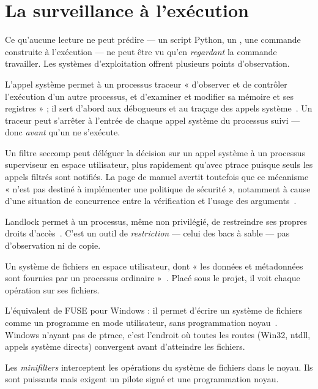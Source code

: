 \section{La surveillance à l'exécution}
\label{sec:execution}

Ce qu'aucune lecture ne peut prédire --- un script Python, un , une commande
construite à l'exécution --- ne peut être vu qu'en \emph{regardant} la commande travailler.
Les systèmes d'exploitation offrent plusieurs points d'observation.

\begin{description}[style=nextline,leftmargin=0.6cm,font=\sffamily\bfseries]
  \item[ptrace (Linux)]
    L'appel système  permet à un processus traceur « d'observer et de
    contrôler l'exécution d'un autre processus, et d'examiner et modifier sa mémoire et ses
    registres » ; il sert d'abord aux débogueurs et au traçage des appels
    système~\cite{man-ptrace}. Un traceur peut s'arrêter à l'entrée de chaque appel système
    du processus suivi --- donc \emph{avant} qu'un  ne s'exécute.
  \item[seccomp avec notification (Linux)]
    Un filtre seccomp peut déléguer la décision sur un appel système à un processus
    superviseur en espace utilisateur, plus rapidement qu'avec ptrace puisque seuls les
    appels filtrés sont notifiés. La page de manuel avertit toutefois que ce mécanisme
    « n'est pas destiné à implémenter une politique de sécurité », notamment à cause d'une
    situation de concurrence entre la vérification et l'usage des
    arguments~\cite{man-seccomp-unotify}.
  \item[Landlock (Linux)]
    Landlock permet à un processus, même non privilégié, de restreindre ses propres droits
    d'accès~\cite{landlock}. C'est un outil de \emph{restriction} --- celui des bacs à sable ---
    pas d'observation ni de copie.
  \item[FUSE (Linux)]
    Un système de fichiers en espace utilisateur, dont « les données et métadonnées sont
    fournies par un processus ordinaire »~\cite{fuse-kernel}. Placé sous le projet, il voit
    chaque opération sur ses fichiers.
  \item[WinFsp (Windows)]
    L'équivalent de FUSE pour Windows : il permet d'écrire un système de fichiers comme un
    programme en mode utilisateur, sans programmation noyau~\cite{winfsp}. Windows n'ayant
    pas de ptrace, c'est l'endroit où toutes les routes (Win32, ntdll, appels système
    directs) convergent avant d'atteindre les fichiers.
  \item[Pilotes de filtre noyau (Windows)]
    Les \textit{minifilters} interceptent les opérations du système de fichiers dans le
    noyau. Ils sont puissants mais exigent un pilote signé et une programmation noyau.
\end{description}

